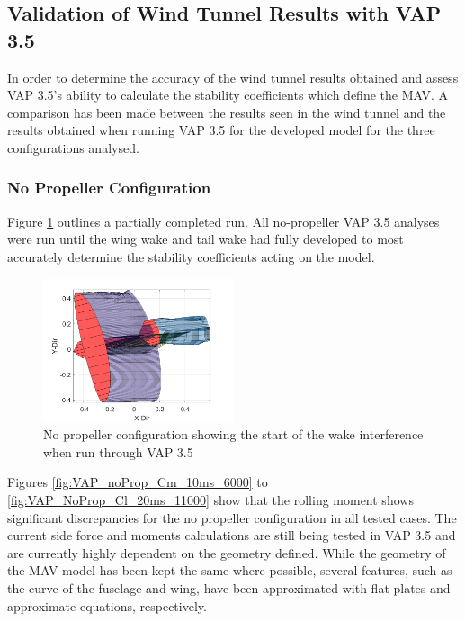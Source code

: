 \subsection{Validation of Wind Tunnel Results with VAP 3.5}

In order to determine the accuracy of the wind tunnel results obtained and assess VAP 3.5's ability to calculate the stability coefficients which define the MAV. A comparison has been made between the results seen in the wind tunnel and the results obtained when running VAP 3.5 for the developed model for the three configurations analysed.



\subsubsection{No Propeller Configuration}
 Figure \ref{fig:nopropmodelVAP} outlines a partially completed run. All no-propeller VAP 3.5 analyses were run until the wing wake and tail wake had fully developed to most accurately determine the stability coefficients acting on the model.
 \begin{figure}
 \centering
        \includegraphics[width=0.5\textwidth]{05_Results/Figs/wake.png}
        \caption{No propeller configuration showing the start of the wake interference when run through VAP 3.5}
        \label{fig:nopropmodelVAP}
\end{figure}
 
Figures \ref{fig:VAP_noProp_Cm_10ms_6000} to \ref{fig:VAP_NoProp_Cl_20ms_11000} show that the rolling moment shows significant discrepancies for the no propeller configuration in all tested cases. The current side force and moments calculations are still being tested in VAP 3.5 and are currently highly dependent on the geometry defined. While the geometry of the \acrshort{MAV} model has been kept the same where possible, several features, such as the curve of the fuselage and wing, have been approximated with flat plates and approximate equations, respectively.


